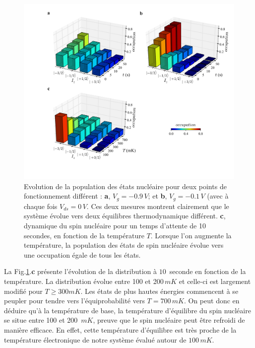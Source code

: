 \begin{figure}
\includegraphics[scale=0.45]{Resultats/SpinTemp/SpinTemp.pdf} 
\caption{Evolution de la population des états nucléaire pour deux points de fonctionnement différent : \textbf{a}, $V_g = -0.9\,V$; et \textbf{b}, $V_g = -0.1\,V$ (avec à chaque fois $V_{ds} = 0\,V$. Ces deux mesures montrent clairement que le système évolue vers deux équilibres thermodynamique différent. \textbf{c}, dynamique du spin nucléaire pour un temps d'attente de 10 secondes, en fonction de la température $T$. Lorsque l'on augmente la température, la population des états de spin nucléaire évolue vers une occupation égale de tous les états.}
\label{dynamique_spin}
\end{figure}


La Fig.\ref{dynamique_spin}.\textbf{c} présente l'évolution de la distribution à $10\,$ seconde en fonction de la température. La distribution évolue entre 100 et 200$\,mK$ et celle-ci est largement modifié pour $T\geq 300mK$. Les états de plus hautes énergies commencent à se peupler pour tendre vers l'équiprobabilité vers $T=700\,mK$. On peut donc en déduire qu'à la température de base, la température d'équilibre du spin nucléaire se situe entre 100 et 200 $\,mK$, preuve que le spin nucléaire peut être refroidi de manière efficace. En effet, cette température d'équilibre est très proche de la température électronique de notre système évalué autour de $100\,mK$.

